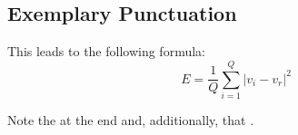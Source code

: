 \documentclass[11pt,a4paper]{article}
\begin{document}




\subsection{Exemplary Punctuation}
\label{sec-math:punctuation}
\begin{goodexample}
  
\end{goodexample}

\begin{badexample}
  This leads to the following formula:
    \begin{equation}
    E = \frac{1}{Q} \sum_{i=1}^{Q}{|v_i - v_r|^2}
    \end{equation}

    Note the  at the end and, additionally, that .
\end{badexample}

\vfill
\end{document}
